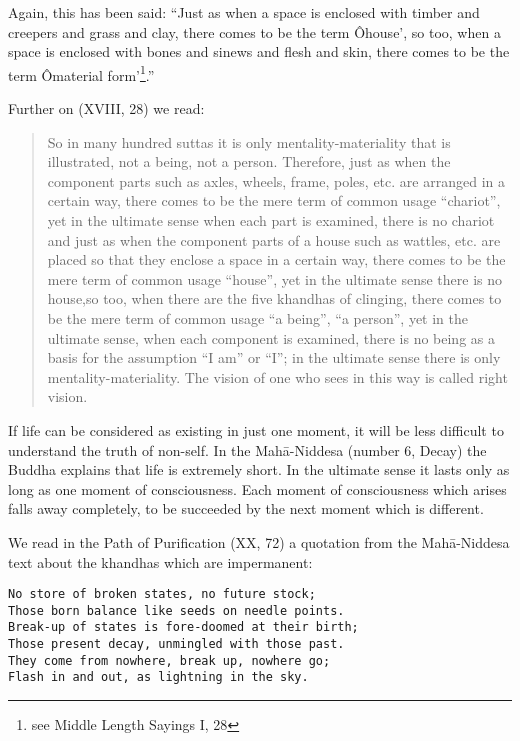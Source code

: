 \documentclass{book}
\begin{document}
Again, this has been said: ``Just as when a space is enclosed with
timber and creepers and grass and clay, there comes to be the term
Ôhouse', so too, when a space is enclosed with bones and sinews and
flesh and skin, there comes to be the term Ômaterial form'\footnote{ see
  Middle Length Sayings I, 28}.''

Further on (XVIII, 28) we read:

\begin{quote}
So in many hundred suttas it is only mentality-materiality that is
illustrated, not a being, not a person. Therefore, just as when the
component parts such as axles, wheels, frame, poles, etc. are arranged
in a certain way, there comes to be the mere term of common usage
``chariot'', yet in the ultimate sense when each part is examined, there
is no chariot and just as when the component parts of a house such as
wattles, etc. are placed so that they enclose a space in a certain way,
there comes to be the mere term of common usage ``house'', yet in the
ultimate sense there is no house,so too, when there are the five
khandhas of clinging, there comes to be the mere term of common usage
``a being'', ``a person'', yet in the ultimate sense, when each
component is examined, there is no being as a basis for the assumption
``I am'' or ``I''; in the ultimate sense there is only
mentality-materiality. The vision of one who sees in this way is called
right vision.
\end{quote}

If life can be considered as existing in just one moment, it will be
less difficult to understand the truth of non-self. In the Mahā-Niddesa
(number 6, Decay) the Buddha ex­plains that life is extremely short. In
the ultimate sense it lasts only as long as one moment of consciousness.
Each moment of consciousness which arises falls away com­pletely, to be
succeeded by the next moment which is different.

We read in the Path of Purification (XX, 72) a quotation from the
Mahā-Niddesa text about the khandhas which are impermanent:

\begin{verbatim}
No store of broken states, no future stock;
Those born balance like seeds on needle points.
Break-up of states is fore-doomed at their birth;
Those present decay, unmingled with those past.
They come from nowhere, break up, nowhere go;
Flash in and out, as lightning in the sky.
\end{verbatim}
\end{document}
